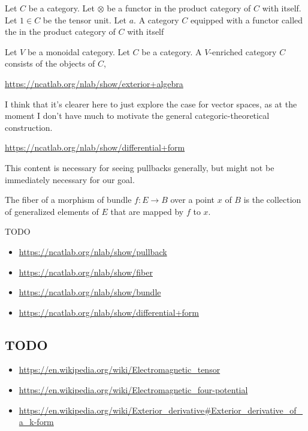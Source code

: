 \documentclass[12pt,letterpaper,titlepage,twoside]{article}
\begin{document}
\begin{definition}
  Let $C$ be a category.
  Let $⊗ $ be a functor in the product category of $C$ with itself.
  Let $1∈ C$ be the tensor unit.
  Let $a$.
  A category $C$ equipped with a functor called the  in the product category of $C$ with itself
\end{definition}

\begin{definition}
  Let $V$ be a monoidal category.
  Let $C$ be a category.
  A $V$-enriched category $C$ consists of the objects of $C$, 
\end{definition}



\begin{definition}
  \url{https://ncatlab.org/nlab/show/exterior+algebra}
\end{definition}

I think that it's clearer here to just explore the case for vector spaces, as at the moment I don't have much to motivate the general categoric-theoretical construction.

\begin{definition}
  \url{https://ncatlab.org/nlab/show/differential+form}
\end{definition}

This content is necessary for seeing pullbacks generally, but might not be immediately necessary for our goal.

\begin{definition}[fiber]
The fiber of a morphism of bundle $f:E→ B$ over a point $x$ of $B$ is the collection of generalized elements of $E$ that are mapped by $f$ to $x$.
\end{definition}

\begin{definition}[pullback]
  
\end{definition}

TODO
\begin{itemize}
  \item \url{https://ncatlab.org/nlab/show/pullback}
  \item \url{https://ncatlab.org/nlab/show/fiber}
  \item \url{https://ncatlab.org/nlab/show/bundle}
  \item \url{https://ncatlab.org/nlab/show/differential+form}
\end{itemize}

\subsection{TODO}

\begin{itemize}
  \item \url{https://en.wikipedia.org/wiki/Electromagnetic_tensor}
  \item \url{https://en.wikipedia.org/wiki/Electromagnetic_four-potential}
  \item \url{https://en.wikipedia.org/wiki/Exterior_derivative#Exterior_derivative_of_a_k-form}
\end{itemize}
\end{document}
